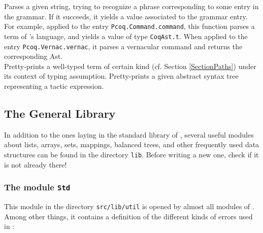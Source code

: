 \begin{description}
    {Parses a given string, trying to recognize a phrase
     corresponding to some entry in the grammar. If it succeeds,
     it yields a value associated to the grammar entry. For example,
     applied to the entry \texttt{Pcoq.Command.command}, this function
    parses a term of \Coq's language, and yields a value of type 
    \texttt{CoqAst.t}. When applied to the entry
    \texttt{Pcoq.Vernac.vernac}, it parses a vernacular command and
    returns the corresponding Ast.}
    {\\ Pretty-prints a well-typed term of certain kind (cf. Section
    \ref{SectionPaths}) under its context of typing assumption.}
    {Pretty-prints a given abstract syntax tree representing a tactic
     expression.}
\end{description}

\subsection{The General Library}

In addition to the ones laying in the standard library of \ocaml{},
several useful modules about lists, arrays, sets, mappings, balanced
trees, and other frequently used data structures can be found in the
directory \texttt{lib}. Before writing a new one, check if it is not
already there!

\subsubsection{The module \texttt{Std}}
This module in the directory \texttt{src/lib/util} is opened by almost 
all modules of \Coq{}. Among other things, it contains a definition of 
the different kinds of errors used in \Coq{} :

